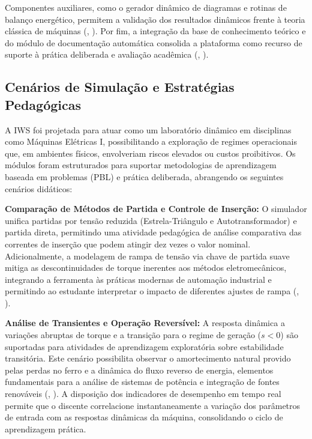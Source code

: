 \documentclass[a4paper]{ifacconf}
\begin{document}
Componentes auxiliares, como o gerador dinâmico de diagramas e rotinas de balanço energético, permitem a validação dos resultados dinâmicos frente à teoria clássica de máquinas (\citeauthor{kumari2025comparative}, \citeyear{kumari2025comparative}). Por fim, a integração da base de conhecimento teórico e do módulo de documentação automática consolida a plataforma como recurso de suporte à prática deliberada e avaliação acadêmica (\citeauthor{souza2011ambiente}, \citeyear{souza2011ambiente}).

\subsection{Cenários de Simulação e Estratégias Pedagógicas}

A IWS foi projetada para atuar como um laboratório dinâmico em disciplinas como Máquinas Elétricas I, possibilitando a exploração de regimes operacionais que, em ambientes físicos, envolveriam riscos elevados ou custos proibitivos. Os módulos foram estruturados para suportar metodologias de aprendizagem baseada em problemas (PBL) e prática deliberada, abrangendo os seguintes cenários didáticos:

\textbf{Comparação de Métodos de Partida e Controle de Inserção:} O simulador unifica partidas por tensão reduzida (Estrela-Triângulo e Autotransformador) e partida direta, permitindo uma atividade pedagógica de análise comparativa das correntes de inserção que podem atingir dez vezes o valor nominal. Adicionalmente, a modelagem de rampa de tensão via chave de partida suave mitiga as descontinuidades de torque inerentes aos métodos eletromecânicos, integrando a ferramenta às práticas modernas de automação industrial e permitindo ao estudante interpretar o impacto de diferentes ajustes de rampa (\citeauthor{singh2015}, \citeyear{singh2015}).

\textbf{Análise de Transientes e Operação Reversível:} A resposta dinâmica a variações abruptas de torque e a transição para o regime de geração ($s < 0$) são suportadas para atividades de aprendizagem exploratória sobre estabilidade transitória. Este cenário possibilita observar o amortecimento natural provido pelas perdas no ferro e a dinâmica do fluxo reverso de energia, elementos fundamentais para a análise de sistemas de potência e integração de fontes renováveis (\citeauthor{ikeda2007simulation}, \citeyear{ikeda2007simulation}). A disposição dos indicadores de desempenho em tempo real permite que o discente correlacione instantaneamente a variação dos parâmetros de entrada com as respostas dinâmicas da máquina, consolidando o ciclo de aprendizagem prática.
\end{document}

